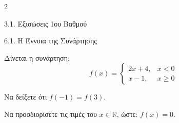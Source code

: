 \begin{ylh}{2}
    \item 3.1. Εξισώσεις 1ου Βαθμού
    \item 6.1. Η Έννοια της Συνάρτησης
\end{ylh}
Δίνεται η συνάρτηση: \[ f(x) = \begin{cases} 2x + 4, & x < 0 \\ x - 1, & x \ge 0 \end{cases} \]

\begin{alist}
\item Να δείξετε ότι $f(-1) = f(3)$.
\item Να προσδιορίσετε τις τιμές του $x \in \mathbb{R}$, ώστε: $f(x) = 0$.
\end{alist}

